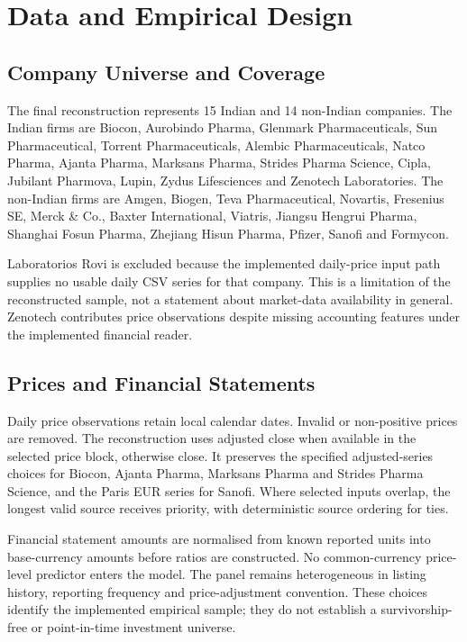 \documentclass[letterpaper,10pt,conference]{ieeeconf}
\begin{document}
\section{Data and Empirical Design}
\subsection{Company Universe and Coverage}
The final reconstruction represents 15 Indian and 14 non-Indian companies. The Indian firms are Biocon, Aurobindo Pharma, Glenmark Pharmaceuticals, Sun Pharmaceutical, Torrent Pharmaceuticals, Alembic Pharmaceuticals, Natco Pharma, Ajanta Pharma, Marksans Pharma, Strides Pharma Science, Cipla, Jubilant Pharmova, Lupin, Zydus Lifesciences and Zenotech Laboratories. The non-Indian firms are Amgen, Biogen, Teva Pharmaceutical, Novartis, Fresenius SE, Merck \& Co., Baxter International, Viatris, Jiangsu Hengrui Pharma, Shanghai Fosun Pharma, Zhejiang Hisun Pharma, Pfizer, Sanofi and Formycon.

Laboratorios Rovi is excluded because the implemented daily-price input path supplies no usable daily CSV series for that company. This is a limitation of the reconstructed sample, not a statement about market-data availability in general. Zenotech contributes price observations despite missing accounting features under the implemented financial reader.

\subsection{Prices and Financial Statements}
Daily price observations retain local calendar dates. Invalid or non-positive prices are removed. The reconstruction uses adjusted close when available in the selected price block, otherwise close. It preserves the specified adjusted-series choices for Biocon, Ajanta Pharma, Marksans Pharma and Strides Pharma Science, and the Paris EUR series for Sanofi. Where selected inputs overlap, the longest valid source receives priority, with deterministic source ordering for ties.

Financial statement amounts are normalised from known reported units into base-currency amounts before ratios are constructed. No common-currency price-level predictor enters the model. The panel remains heterogeneous in listing history, reporting frequency and price-adjustment convention. These choices identify the implemented empirical sample; they do not establish a survivorship-free or point-in-time investment universe.
\end{document}
